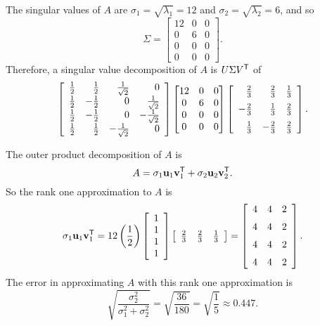 \begin{example}
The singular values of $A$ are $\sigma_1 = \sqrt{\lambda_1} = 12$ and $\sigma_2 = \sqrt{\lambda_2} = 6$, and so
\[\Sigma = \begin{bmatrix} 12&0&0 \\ 0&6&0 \\0&0&0 \\ 0&0&0 \end{bmatrix}.\]
Therefore, a singular value decomposition of $A$ is $U \Sigma V^{\mathsf{T}}$ of
\[\left[ \begin{array}{crrr} \frac{1}{2} & \frac{1}{2} & \frac{1}{\sqrt{2}} & 0 \\ \frac{1}{2} & -\frac{1}{2} & 0 & \frac{1}{\sqrt{2}} \\  \frac{1}{2} & -\frac{1}{2} & 0 & -\frac{1}{\sqrt{2}} \\ \frac{1}{2} & \frac{1}{2} & -\frac{1}{\sqrt{2}} & 0 \\\end{array} \right] \begin{bmatrix} 12&0&0 \\ 0&6&0 \\0&0&0 \\ 0&0&0 \end{bmatrix} \left[ \begin {array}{rrc} \frac{2}{3}&\frac{2}{3}&\frac{1}{3}\\ \noalign{\medskip}-\frac{2}{3}&\frac{1}{3}&\frac{2}{3}\\ \noalign{\medskip} \frac{1}{3}&-\frac{2}{3}&\frac{2}{3}\end {array} \right].\]

\item  The outer product decomposition of $A$ is
\[A = \sigma_1 \mathbf{u}_1 \mathbf{v}_1^{\mathsf{T}} + \sigma_2 \mathbf{u}_2 \mathbf{v}_2^{\mathsf{T}}.\]
So the rank one approximation to $A$ is
\[ \sigma_1 \vu_1 \vv_1^{\tr} = 12 \left(\frac{1}{2}\right) \left[ \begin{array}{c} 1\\1\\1\\1\\ \end{array} \right] \left[ \begin{array}{ccc} \frac{2}{3} & \frac{2}{3} & \frac{1}{3} \end{array} \right] = \left[ \begin {array}{ccc} 4&4&2\\ \noalign{\medskip}4&4&2 \\ \noalign{\medskip}4&4&2\\ \noalign{\medskip}4&4&2\end {array}  \right].\]
The error in approximating $A$ with this rank one approximation is
\[\sqrt{\frac{\sigma_2^2}{\sigma_1^2+\sigma_2^2}} = \sqrt{\frac{36}{180}} = \sqrt{\frac{1}{5}} \approx 0.447.\]


\end{example}
